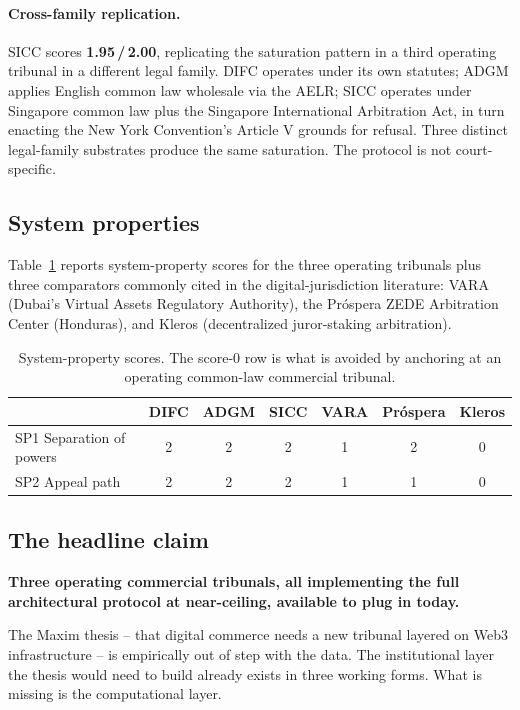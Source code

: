 \documentclass[11pt,letterpaper]{article}
\begin{document}
\paragraph{Cross-family replication.} SICC scores \textbf{1.95\,/\,2.00}, replicating the saturation pattern in a third operating tribunal in a different legal family. DIFC operates under its own statutes; ADGM applies English common law wholesale via the AELR; SICC operates under Singapore common law plus the Singapore International Arbitration Act, in turn enacting the New York Convention's Article V grounds for refusal. Three distinct legal-family substrates produce the same saturation. The protocol is not court-specific.

\subsection{System properties}

Table~\ref{tab:sysprops} reports system-property scores for the three operating tribunals plus three comparators commonly cited in the digital-jurisdiction literature: VARA (Dubai's Virtual Assets Regulatory Authority), the Pr\'ospera ZEDE Arbitration Center (Honduras), and Kleros (decentralized juror-staking arbitration).

\begin{table}[h]
\centering
\caption{System-property scores. The score-0 row is what is avoided by anchoring at an operating common-law commercial tribunal.}
\label{tab:sysprops}
\small
\begin{tabular}{l c c c c c c}
\toprule
& \textbf{DIFC} & \textbf{ADGM} & \textbf{SICC} & \textbf{VARA} & \textbf{Pr\'ospera} & \textbf{Kleros} \\
\midrule
SP1 Separation of powers & 2 & 2 & 2 & 1 & 2 & 0 \\
SP2 Appeal path          & 2 & 2 & 2 & 1 & 1 & 0 \\
\bottomrule
\end{tabular}
\end{table}

\subsection{The headline claim}

\begin{callout}
\noindent\textbf{Three operating commercial tribunals, all implementing the full architectural protocol at near-ceiling, available to plug in today.}\par
\smallskip
\noindent The Maxim thesis -- that digital commerce needs a new tribunal layered on Web3 infrastructure -- is empirically out of step with the data. The institutional layer the thesis would need to build already exists in three working forms. What is missing is the computational layer.
\end{callout}
\end{document}

